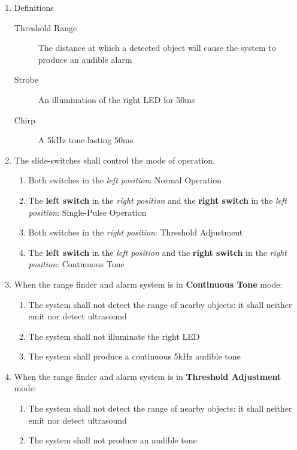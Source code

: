 \begin{enumerate}
    \item Definitions
        \begin{description}
            \item[Threshold Range] The distance at which a detected object will cause the system to produce an audible alarm
            \item[Strobe] An illumination of the right LED for 50ms
            \item[Chirp] A 5kHz tone lasting 50ms
        \end{description}
    \item \label{spec:modes} The slide-switches shall control the mode of operation.
        \begin{enumerate}
            \item Both switches in the \textit{left position}: Normal Operation
            \item The \textbf{left switch} in the \textit{right position} and the \textbf{right switch} in the \textit{left position}: Single-Pulse Operation
            \item Both switches in the \textit{right position}: Threshold Adjustment
            \item The \textbf{left switch} in the \textit{left position} and the \textbf{right switch} in the \textit{right position}: Continuous Tone
        \end{enumerate}
    \item \label{spec:continuousTone} When the range finder and alarm system is in \textbf{Continuous Tone} mode:
        \begin{enumerate}
            \item The system shall not detect the range of nearby objects: it shall neither emit nor detect ultrasound
            \item The system shall not illuminate the right LED
            \item The system shall produce a continuous 5kHz audible tone
        \end{enumerate}
    \item \label{spec:thresholdAdjustment} When the range finder and alarm system is in \textbf{Threshold Adjustment} mode:
        \begin{enumerate}
            \item The system shall not detect the range of nearby objects: it shall neither emit nor detect ultrasound
            \item The system shall not produce an audible tone

\end{enumerate}
\end{enumerate}
